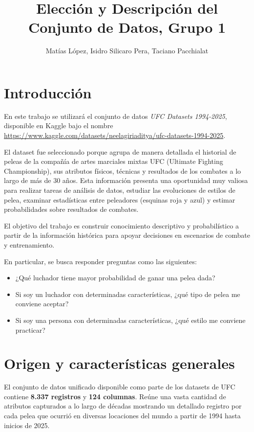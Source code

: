 \documentclass[11pt,a4paper]{article}
\title{\textbf{Elección y Descripción del Conjunto de Datos, Grupo 1}}
\author{Matías López, Isidro Silicaro Pera, Taciano Pacchialat}
\date{}
\begin{document}
\maketitle

\section{Introducción}

En este trabajo se utilizará el conjunto de datos \textit{UFC Datasets 1994-2025}, disponible en Kaggle bajo el nombre \url{https://www.kaggle.com/datasets/neelagiriaditya/ufc-datasets-1994-2025}.

El dataset fue seleccionado porque agrupa de manera detallada el historial de peleas de la compañía de artes marciales mixtas UFC (Ultimate Fighting Championship), sus atributos físicos, técnicas y resultados de los combates a lo largo de más de 30 años. Esta información presenta una oportunidad muy valiosa para realizar tareas de análisis de datos, estudiar las evoluciones de estilos de pelea, examinar estadísticas entre peleadores (esquinas roja y azul) y estimar probabilidades sobre resultados de combates.

El objetivo del trabajo es construir conocimiento descriptivo y probabilístico a partir de la información histórica para apoyar decisiones en escenarios de combate y entrenamiento.

En particular, se busca responder preguntas como las siguientes:

\begin{itemize}[leftmargin=*]
\item ¿Qué luchador tiene mayor probabilidad de ganar una pelea dada?
\item Si soy un luchador con determinadas características, ¿qué tipo de pelea me conviene aceptar?
\item Si soy una persona con determinadas características, ¿qué estilo me conviene practicar?
\end{itemize}

\section{Origen y características generales}

El conjunto de datos unificado  disponible como parte de los datasets de UFC contiene \textbf{8.337 registros} y \textbf{124 columnas}. Reúne una vasta cantidad de atributos capturados a lo largo de décadas mostrando un detallado registro por cada pelea que ocurrió en diversas locaciones del mundo a partir de 1994 hasta inicios de 2025. 
\end{document}
